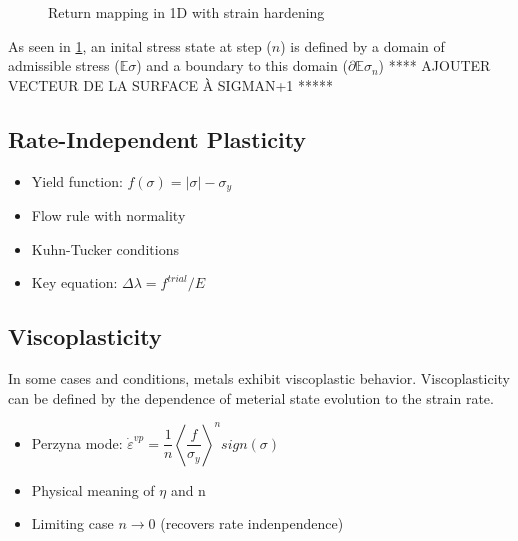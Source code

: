 \documentclass[final,5p,times,twocolumn]{elsarticle}
\begin{document}
\begin{figure}
\caption{Return mapping in 1D with strain hardening}
\label{fig:returnmap}
\end{figure}

As seen in \ref{fig:returnmap}, an inital stress state at step ($n$) is defined by a domain of admissible stress ($\mathbb{E} \sigma$) and a boundary to this domain ($\partial \mathbb{E}\sigma_{n}$)
**** AJOUTER VECTEUR DE LA SURFACE À SIGMAN+1 *****

\subsection{Rate-Independent Plasticity}
\label{Rate-Independent Plasticity}
\begin{itemize}
  \item Yield function: $f(\sigma)=|\sigma|-\sigma_{y}$
  \item Flow rule with normality
  \item Kuhn-Tucker conditions
  \item Key equation: $\Delta \lambda = f^{trial} / E$
\end{itemize}

\subsection{Viscoplasticity}
\label{Viscoplasticity}
In some cases and conditions, metals exhibit viscoplastic behavior. Viscoplasticity can be defined by the dependence of meterial state evolution to the strain rate. 
\begin{itemize}
  \item Perzyna mode: $\dot{\varepsilon}^{vp}= \dfrac{1}{n} \left\langle  \dfrac{f}{\sigma_{y}} \right\rangle^{n} sign(\sigma)$
  \item Physical meaning of $\eta$ and n
  \item Limiting case $n \rightarrow 0$ (recovers rate indenpendence)
\end{itemize}
\end{document}
